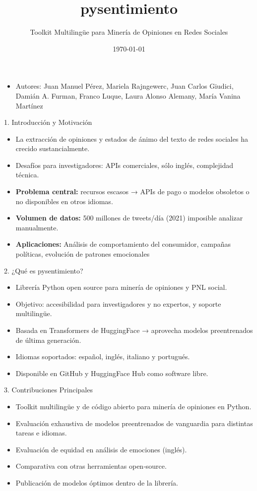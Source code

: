 \documentclass{beamer}
\title{pysentimiento}
\subtitle{Toolkit Multilingüe para Minería de Opiniones en Redes Sociales}
\date{\today}
\begin{document}
\begin{frame}
  \titlepage
  \begin{itemize}
    \item Autores: Juan Manuel Pérez, Mariela Rajngewerc, Juan Carlos Giudici, Damián A. Furman, Franco Luque, Laura Alonso Alemany, María Vanina Martínez
  \end{itemize}
\end{frame}

\begin{frame}{1. Introducción y Motivación}
  \begin{itemize}
    \item La extracción de opiniones y estados de ánimo del texto de redes sociales ha crecido sustancialmente.
    \item Desafíos para investigadores: APIs comerciales, sólo inglés, complejidad técnica.
    \pause
    \item \textbf{Problema central:} recursos escasos → APIs de pago o modelos obsoletos o no disponibles en otros idiomas.
    \pause
    \item \textbf{Volumen de datos:} 500 millones de tweets/día (2021) \- imposible analizar manualmente.
    \pause
    \item \textbf{Aplicaciones:} Análisis de comportamiento del consumidor, campañas políticas, evolución de patrones emocionales
  \end{itemize}
\end{frame}

\begin{frame}{2. ¿Qué es pysentimiento?}
  \begin{itemize}
    \item Librería Python open source para minería de opiniones y PNL social.
    \item Objetivo: accesibilidad para investigadores y no expertos, y soporte multilingüe.
    \item Basada en Transformers de HuggingFace → aprovecha modelos preentrenados de última generación.
    \item Idiomas soportados: español, inglés, italiano y portugués.
    \item Disponible en GitHub y HuggingFace Hub como software libre.
  \end{itemize}
\end{frame}

\begin{frame}{3. Contribuciones Principales}
  \begin{itemize}
    \item Toolkit multilingüe y de código abierto para minería de opiniones en Python.
    \item Evaluación exhaustiva de modelos preentrenados de vanguardia para distintas tareas e idiomas.
    \item Evaluación de equidad en análisis de emociones (inglés).
    \item Comparativa con otras herramientas open‑source.
    \item Publicación de modelos óptimos dentro de la librería.
  \end{itemize}
\end{frame}
\end{document}

